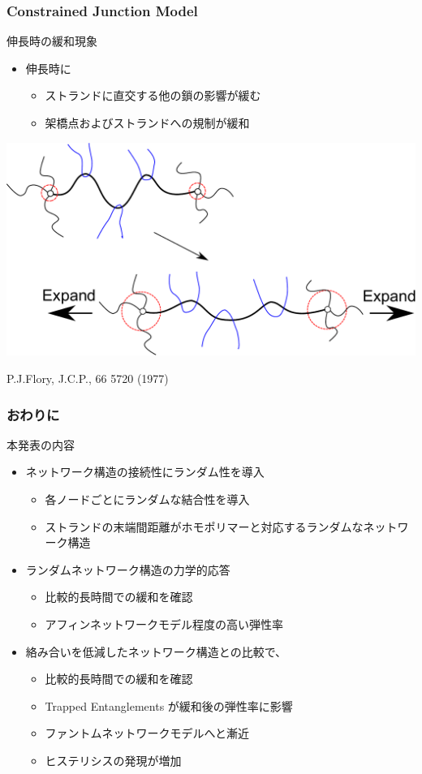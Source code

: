 \documentclass[12pt, dvipdfmx]{beamer}
\begin{document}
\begin{frame}
    \frametitle{Constrained Junction Model}
	\begin{exampleblock}{伸長時の緩和現象}
		\begin{itemize}
			\item 伸長時に
			\begin{itemize}
				\item ストランドに直交する他の鎖の影響が緩む
				\item 架橋点およびストランドへの規制が緩和
			\end{itemize}
		\end{itemize}
		\begin{center}
			\includegraphics[width=.7\textwidth]{Constrained_Juntion.pdf}

			P.J.Flory, J.C.P., 66 5720 (1977)
		\end{center}
	\end{exampleblock}
\end{frame}		

\begin{frame}
	\frametitle{おわりに}
		\begin{block}{本発表の内容}
			\begin{itemize}
			\item ネットワーク構造の接続性にランダム性を導入
				\begin{itemize}
					\item 各ノードごとにランダムな結合性を導入
					\item ストランドの末端間距離がホモポリマーと対応するランダムなネットワーク構造
				\end{itemize}
			\item ランダムネットワーク構造の力学的応答
				\begin{itemize}
					\item 比較的長時間での緩和を確認
					\item アフィンネットワークモデル程度の高い弾性率
				\end{itemize}
			\item 絡み合いを低減したネットワーク構造との比較で、
				\begin{itemize}
					\item 比較的長時間での緩和を確認
					\item Trapped Entanglements が緩和後の弾性率に影響 
					\item ファントムネットワークモデルへと漸近
					\item ヒステリシスの発現が増加
				\end{itemize}
			\end{itemize}
		\end{block}
\end{frame}
\end{document}
